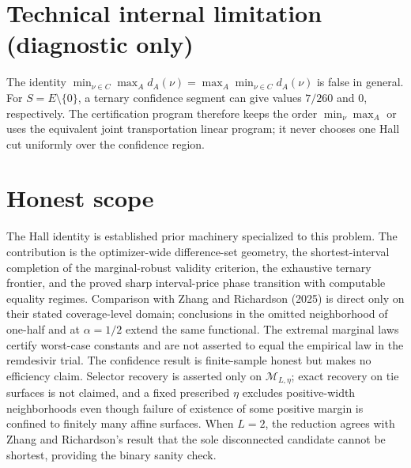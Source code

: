 \documentclass{article}
\begin{document}
\section*{Technical internal limitation (diagnostic only)}

The identity \(\min_{\nu\in C}\max_A d_A(\nu)=\max_A\min_{\nu\in C}d_A(\nu)\) is false in general. For \(S=E\setminus\{0\}\), a ternary confidence segment can give values \(7/260\) and \(0\), respectively. The certification program therefore keeps the order \(\min_{\nu}\max_A\) or uses the equivalent joint transportation linear program; it never chooses one Hall cut uniformly over the confidence region.

\section{Honest scope}

The Hall identity is established prior machinery specialized to this problem. The contribution is the optimizer-wide difference-set geometry, the shortest-interval completion of the marginal-robust validity criterion, the exhaustive ternary frontier, and the proved sharp interval-price phase transition with computable equality regimes. Comparison with Zhang and Richardson (2025) is direct only on their stated coverage-level domain; conclusions in the omitted neighborhood of one-half and at \(\alpha=1/2\) extend the same functional. The extremal marginal laws certify worst-case constants and are not asserted to equal the empirical law in the remdesivir trial. The confidence result is finite-sample honest but makes no efficiency claim. Selector recovery is asserted only on \(\mathcal M_{L,\eta}\); exact recovery on tie surfaces is not claimed, and a fixed prescribed \(\eta\) excludes positive-width neighborhoods even though failure of existence of some positive margin is confined to finitely many affine surfaces. When \(L=2\), the reduction agrees with Zhang and Richardson's result that the sole disconnected candidate cannot be shortest, providing the binary sanity check.
\end{document}
